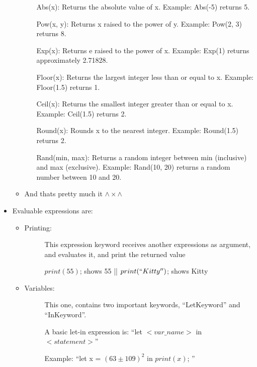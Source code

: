 \begin{itemize}
\begin{itemize}
\begin{itemize}
                        \item[Abs{(x)}:] Returns the absolute value of x. Example: Abs{(-5)} returns 5.
                        \item[Pow{(x, y)}:] Returns x raised to the power of y. Example: Pow{(2, 3)} returns 8.
                        \item[Exp{(x)}:] Returns e raised to the power of x. Example: Exp{(1)} returns approximately 2.71828.
                        \item[Floor{(x)}:] Returns the largest integer less than or equal to x. Example: Floor{(1.5)} returns 1.
                        \item[Ceil{(x)}:] Returns the smallest integer greater than or equal to x. Example: Ceil{(1.5)} returns 2.
                        \item[Round{(x)}:] Rounds x to the nearest integer. Example: Round{(1.5)} returns 2.
                        \item[Rand{(min, max)}:] Returns a random integer between min (inclusive) and max (exclusive). Example: Rand{(10, 20)} returns a random number between 10 and 20.
                    \end{itemize}
                \item And thats pretty much it $\land\times \land$ 
            \end{itemize}
        \item Evaluable expressions are:
            \begin{itemize}
                \item Printing:
                    \begin{description}
                    \item[] This expression keyword receives another expressions as argument, and evaluates it, and print the returned value
                    \item[] $print(55)$; shows 55 || $print(``Kitty'')$; shows Kitty
                    \end{description}
                \item Variables:
                    \begin{description}
                        \item[] This one, contains two important keywords, ``LetKeyword'' and ``InKeyword''.
                        \item[] A basic let-in expression is: ``let $<var\_name>$ in $<statement>$''
                        \item[] Example: ``let x = ${(63 \pm 109)}^2$ in $print{(x)}$; ''

\end{description}
\end{itemize}
\end{itemize}
